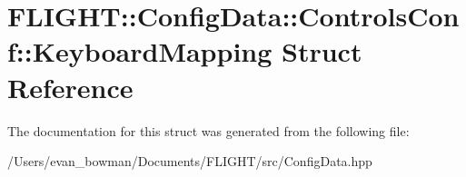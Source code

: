\hypertarget{struct_f_l_i_g_h_t_1_1_config_data_1_1_controls_conf_1_1_keyboard_mapping}{}\section{F\+L\+I\+G\+HT\+:\+:Config\+Data\+:\+:Controls\+Conf\+:\+:Keyboard\+Mapping Struct Reference}
\label{struct_f_l_i_g_h_t_1_1_config_data_1_1_controls_conf_1_1_keyboard_mapping}


The documentation for this struct was generated from the following file\+:\begin{DoxyCompactItemize}
\item 
/\+Users/evan\+\_\+bowman/\+Documents/\+F\+L\+I\+G\+H\+T/src/Config\+Data.\+hpp\end{DoxyCompactItemize}
